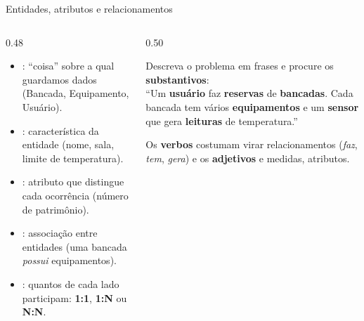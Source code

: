 \documentclass[aspectratio=169,10pt]{beamer}
\begin{document}
\begin{frame}{Entidades, atributos e relacionamentos}
  \begin{columns}[T]
    \begin{column}{0.48\textwidth}
      \begin{itemize}
        \item {}: ``coisa'' sobre a qual guardamos dados (Bancada, Equipamento, Usuário).
        \item {}: característica da entidade (nome, sala, limite de temperatura).
        \item {}: atributo que distingue cada ocorrência (número de patrimônio).
        \item {}: associação entre entidades (uma bancada \emph{possui} equipamentos).
        \item {}: quantos de cada lado participam: \textbf{1:1}, \textbf{1:N} ou \textbf{N:N}.
      \end{itemize}
    \end{column}
    \begin{column}{0.50\textwidth}
      \begin{conceito}
        Descreva o problema em frases e procure os \textbf{substantivos}:\\[2pt]
        ``Um \textbf{usuário} faz \textbf{reservas} de \textbf{bancadas}. Cada bancada tem vários \textbf{equipamentos} e um \textbf{sensor} que gera \textbf{leituras} de temperatura.''
      \end{conceito}
      \begin{caixaambar}
        Os \textbf{verbos} costumam virar relacionamentos (\emph{faz}, \emph{tem}, \emph{gera}) e os \textbf{adjetivos} e medidas, atributos.
      \end{caixaambar}
    \end{column}
  \end{columns}
\end{frame}
\end{document}
